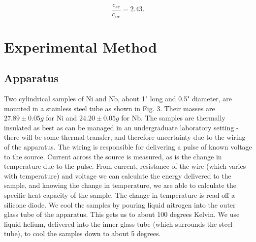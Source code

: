 \documentclass{article}
\begin{document}
\begin{equation}
	\frac{c_{se}}{c_{ne}} =  2.43.
\end{equation}


\section{Experimental Method}
\subsection{Apparatus}

Two cylindrical samples of Ni and Nb, about 1" long and 0.5" diameter, are mounted in a stainless steel tube as shown in Fig. 3. Their masses are $27.89 \pm 0.05 g$ for Ni and $24.20 \pm 0.05 g$ for Nb. The samples are thermally insulated as best as can be managed in an undergraduate laboratory setting - there will be some thermal transfer, and therefore uncertainty due to the wiring of the apparatus. The wiring is responsible for delivering a pulse of known voltage to the source. Current across the source is measured, as is the change in temperature due to the pulse. From current, resistance of the wire (which varies with temperature) and voltage we can calculate the energy delivered to the sample, and knowing the change in temperature, we are able to calculate the specific heat capacity of the sample. The change in temperature is read off a silicone diode. We cool the samples by pouring liquid nitrogen into the outer glass tube of the apparatus. This gets us to about 100 degrees Kelvin. We use liquid helium, delivered into the inner glass tube (which surrounds the steel tube), to cool the samples down to about 5 degrees.
\end{document}
